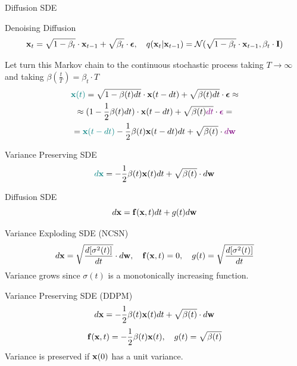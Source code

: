 \begin{frame}{Diffusion SDE}
	\begin{block}{Denoising Diffusion}
		\vspace{-0.5cm}
		\[
			\mathbf{x}_t = \sqrt{1 - \beta_t} \cdot \mathbf{x}_{t - 1} + \sqrt{\beta_t} \cdot \boldsymbol{\epsilon}, \quad q(\mathbf{x}_t | \mathbf{x}_{t-1}) = \mathcal{N}(\sqrt{1 - \beta_t} \cdot \mathbf{x}_{t-1}, \beta_t \cdot \mathbf{I})
		\]
		\vspace{-0.5cm}
	\end{block}
	Let turn this Markov chain to the continuous stochastic process taking $T \rightarrow \infty$ and taking $\beta(\frac{t}{T}) = \beta_t \cdot T$
	\begin{multline*}
		{\color{teal}\mathbf{x}(t)} = \sqrt{1 - \beta(t) dt} \cdot \mathbf{x}(t - dt) + \sqrt{\beta(t)dt} \cdot \boldsymbol{\epsilon} \approx \\
		\approx (1 - \frac{1}{2} \beta(t) dt) \cdot \mathbf{x}(t - dt) + \sqrt{\beta(t){\color{violet}dt}} \cdot {\color{violet}\boldsymbol{\epsilon}} = \\
		= {\color{teal}\mathbf{x}(t - dt)} - \frac{1}{2} \beta(t) \mathbf{x}(t - dt) dt  + \sqrt{\beta(t)} \cdot {\color{violet}d \mathbf{w}}
	\end{multline*}
	\vspace{-0.5cm}
	\begin{block}{Variance Preserving SDE}
		\vspace{-0.3cm}
		\[
			{\color{teal}d \mathbf{x}} = - \frac{1}{2} \beta(t) \mathbf{x}(t) dt + \sqrt{\beta(t)} \cdot d \mathbf{w}
		\]
	\end{block}
\end{frame}
\begin{frame}{Diffusion SDE}
	\vspace{-0.3cm}
	\[
		d\mathbf{x} = \mathbf{f}(\mathbf{x}, t) dt + g(t) d \mathbf{w}
	\]
	\vspace{-0.3cm}
	\begin{block}{Variance Exploding SDE (NCSN)}
		\vspace{-0.5cm}
		\[
			d \mathbf{x} = \sqrt{\frac{ d [\sigma^2(t)]}{dt}} \cdot d \mathbf{w}, \quad \mathbf{f}(\mathbf{x}, t) = 0, \quad g(t) = \sqrt{\frac{ d [\sigma^2(t)]}{dt}} 
		\]
		Variance grows since $\sigma(t)$ is a monotonically increasing function.
	\end{block}
	\begin{block}{Variance Preserving SDE (DDPM)}
		\vspace{-0.3cm}
		\[
			d \mathbf{x} = - \frac{1}{2} \beta(t) \mathbf{x}(t) dt + \sqrt{\beta(t)} \cdot d \mathbf{w}
		\]
		\[
			\mathbf{f}(\mathbf{x}, t) = - \frac{1}{2} \beta(t) \mathbf{x}(t) , \quad g(t) = \sqrt{\beta(t)} 
		\]
		Variance is preserved if $\mathbf{x}(0)$ has a unit variance.
	\end{block}
\end{frame}
